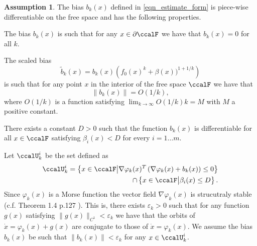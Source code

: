 \documentclass[article]{IEEEtran}
\theoremstyle{definition}
\newtheorem{assumption}{Assumption}
\begin{document}
\begin{assumption}\label{assumption_bias}
The bias $b_k(x)$ defined in \eqref{eqn_estimate_form} is piece-wise differentiable on the free space and has the following properties. 
%
\begin{mylist}
\item[\bf Unbiased at the boundary] The bias $b_k(x)$ is such that for any $x\in \partial \ccalF$ we have that $b_k(x)=0$ for all $k$. 
%
\item[\bf Dependence with $k$] The scaled bias 
%
\begin{equation}
\tilde{b}_k(x) = b_k(x)\left(f_0(x)^k+\beta(x))^{1+1/k}\right)
%
\end{equation}
 is such that for any point $x$ in the interior of the free space $\ccalF$ we have that 
%
\begin{equation}
\|b_k(x)\| =O(1/k),
\end{equation} 
%
where $O(1/k)$ is a function satisfying $\lim_{k\to\infty}O(1/k)k = M$ with $M$ a positive constant.
%
\item[\bf Discontinuities away of the boundary] There exists a constant $D>0$ such that the function $b_k(x)$ is differentiable for all $x\in\ccalF$ satisfying $\beta_i(x)<D$ for every $i=1\ldots m$.
%
%
\item[\bf Regularity Assumption]
%
Let $\ccalU_k^{i}$ be the set defined as 
%
\begin{equation}
\begin{split}
\ccalU_k^{i}=\left\{x\in\ccalF\big| \nabla \varphi_k(x)^T\left(\nabla \varphi_k(x)+b_k(x)\right)\leq0 \right\} \\
\cap \left\{x\in\ccalF\big| \beta_i(x)\leq D \right\}.
\end{split}
\end{equation}
%
Since $\varphi_k(x)$ is a Morse function the vector field $\nabla \varphi_k(x)$ is strucutraly stable (c.f. Theorem 1.4 p.127 \cite{palis1970structural}). This is, there exists $\varepsilon_k>0$ such that for any function $g(x)$ satisfying $\|g(x)\|_{C^1}<\varepsilon_k$ we have that the orbits of $\dot{x} = \varphi_k(x)+g(x)$ are conjugate to those of $\dot{x}=\varphi_k(x)$. We assume the bias $b_k(x)$ be such that $\|b_k(x)\|<\varepsilon_k$ for any $x\in\ccalU_k^i$.
%
\end{mylist}
\end{assumption}
\end{document}
